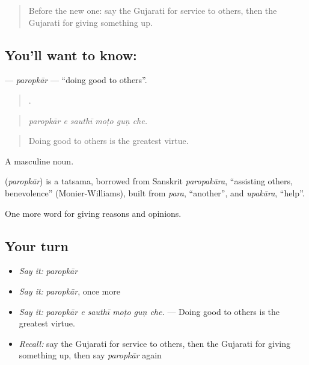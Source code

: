 \label{lesson:GU-C358-paropkar}



\begin{quote}
Before the new one: say the Gujarati for service to others, then the Gujarati for giving something up.
\end{quote}

\subsection*{You'll want to know: }
\textbf{} — \emph{paropkār} — \textquotedblleft{}doing good to others\textquotedblright{}.

\begin{quote}
     .
\end{quote}

\begin{quote}
\emph{paropkār e sauthī moṭo guṇ che.}
\end{quote}

\begin{quote}
Doing good to others is the greatest virtue.
\end{quote}

A masculine noun.

\begin{cousinweb}
\textbf{} (\emph{paropkār}) is a tatsama, borrowed from Sanskrit \emph{paropakāra}, \textquotedblleft{}assisting others, benevolence\textquotedblright{} (Monier-Williams), built from \emph{para}, \textquotedblleft{}another\textquotedblright{}, and \emph{upakāra}, \textquotedblleft{}help\textquotedblright{}.
\end{cousinweb}

\begin{grammarlens}[title={What you've built}]
One more word for giving reasons and opinions.
\end{grammarlens}

\subsection*{Your turn}
\begin{itemize}
\raggedright
  \item \emph{Say it:} \emph{paropkār}
  \item \emph{Say it:} \emph{paropkār}, once more
  \item \emph{Say it:} \emph{paropkār e sauthī moṭo guṇ che.} — Doing good to others is the greatest virtue.
  \item \emph{Recall:} say the Gujarati for service to others, then the Gujarati for giving something up, then say \emph{paropkār} again
\end{itemize}

